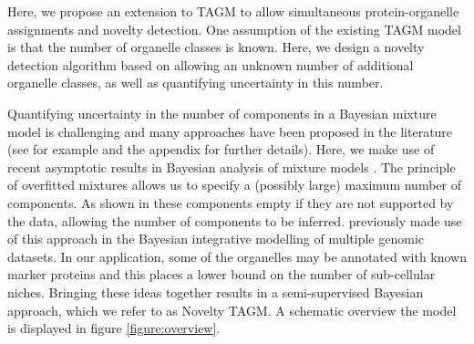 \documentclass[12pt,english]{article}
\begin{document}
Here, we propose an extension to TAGM to allow simultaneous protein-organelle assignments and novelty detection. One assumption of the existing TAGM model is that the number of organelle classes is known. Here, we design a novelty detection algorithm based on allowing an unknown number of additional organelle classes, as well as quantifying uncertainty in this number.

Quantifying uncertainty in the number of components in a Bayesian mixture model is challenging and many approaches have been proposed in the literature (see for example \cite{ferguson::1974, antoniak::1974, Richardson::1997} and the appendix for further details). Here, we make use of recent asymptotic results in Bayesian analysis of mixture models \citep{Rousseau::2011}. The principle of overfitted mixtures allows us to specify a (possibly large) maximum number of components. As shown in \cite{Rousseau::2011} these components empty if they are not supported by the data, allowing the number of components to be inferred. \cite{Kirk:2012} previously made use of this approach in the Bayesian integrative modelling of multiple genomic datasets. In our application, some of the organelles may be annotated with known marker proteins and this places a lower bound on the number of sub-cellular niches. Bringing these ideas together results in a semi-supervised Bayesian approach, which we refer to as Novelty TAGM. A schematic overview the model is displayed in figure \ref{figure:overview}. 
\end{document}
